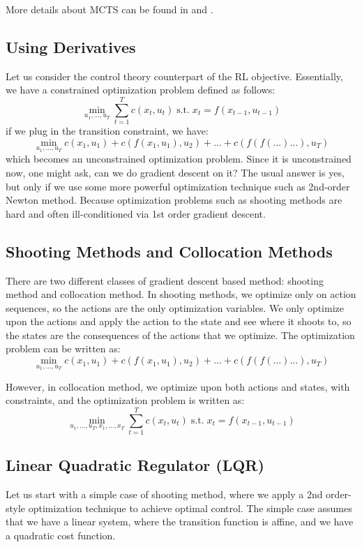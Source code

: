 More details about MCTS can be found in \cite{browne2012survey} and \cite{guo2014deep}.

\subsection{Using Derivatives}
Let us consider the control theory counterpart of the RL objective. Essentially, we have a constrained optimization problem defined as follows:
$$\min_{u_1,...,u_T}\sum_{t=1}^Tc(x_t,u_t)\;\mathrm{s.t.}\;x_t = f(x_{t-1}, u_{t-1})$$
if we plug in the transition constraint, we have:
$$\min_{u_1,...,u_T}c(x_1,u_1) + c(f(x_1,u_1),u_2)+...+c(f(f(...)...),u_T)$$
which becomes an unconstrained optimization problem. Since it is unconstrained now, one might ask, can we do gradient descent on it? The usual answer is yes, but only if we use some more powerful optimization technique such as 2nd-order Newton method. Because optimization problems such as shooting methods are hard and often ill-conditioned via 1st order gradient descent. 
\subsection{Shooting Methods and Collocation Methods}
There are two different classes of gradient descent based method: shooting method and collocation method. In shooting methods, we optimize only on action sequences, so the actions are the only optimization variables. We only optimize upon the actions and apply the action to the state and see where it shoots to, so the states are the consequences of the actions that we optimize. The optimization problem can be written as:
$$\min_{u_1,...,u_T}c(x_1,u_1) + c(f(x_1,u_1),u_2)+...+c(f(f(...)...),u_T)$$

However, in collocation method, we optimize upon both actions and states, with constraints, and the optimization problem is written as:
$$\min_{u_1,...,u_T,x_1,...,x_T}\sum_{t=1}^Tc(x_t,u_t)\;\mathrm{s.t.}\;x_t = f(x_{t-1}, u_{t-1})$$

\subsection{Linear Quadratic Regulator (LQR)}
Let us start with a simple case of shooting method, where we apply a 2nd order-style optimization technique to achieve optimal control. The simple case assumes that we have a linear system, where the transition function is affine, and we have a quadratic cost function. 


